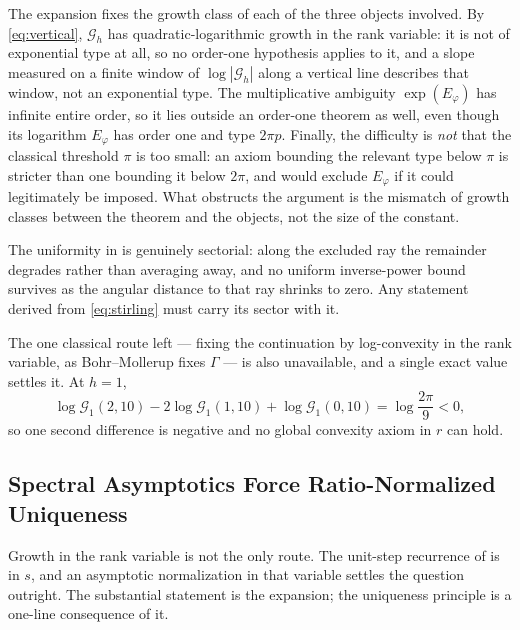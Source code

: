\documentclass[11pt,letterpaper]{article}
\newcommand{\Gc}{\mathcal{G}}               %
\begin{document}
The expansion fixes the growth class of each of the three objects involved.
By \eqref{eq:vertical}, $\Gc_h$ has quadratic-logarithmic growth in the rank
variable: it is not of exponential type at all, so no order-one hypothesis
applies to it, and a slope measured on a finite window of $\log|\Gc_h|$ along a
vertical line describes that window, not an exponential type. The multiplicative
ambiguity $\exp(E_\varphi)$ has infinite entire order, so it lies outside an
order-one theorem as well, even though its logarithm $E_\varphi$ has order one
and type $2\pi p$. Finally, the difficulty is \emph{not} that the classical
threshold $\pi$ is too small: an axiom bounding the relevant type below $\pi$ is
stricter than one bounding it below $2\pi$, and would exclude $E_\varphi$ if it
could legitimately be imposed. What obstructs the argument is the mismatch of
growth classes between the theorem and the objects, not the size of the constant.

The uniformity in  is genuinely sectorial: along the excluded
ray the remainder degrades rather than averaging away, and no uniform
inverse-power bound survives as the angular distance to that ray shrinks to
zero. Any statement derived from \eqref{eq:stirling} must carry its sector with
it.

\begin{remark}
\label{rem:noconvex}
The one classical route left --- fixing the continuation by log-convexity in the
rank variable, as Bohr--Mollerup fixes $\Gamma$ --- is also unavailable, and a
single exact value settles it. At $h=1$,
\begin{equation}
  \log\Gc_1(2,10)-2\log\Gc_1(1,10)+\log\Gc_1(0,10)=\log\frac{2\pi}{9}<0 ,
  \label{eq:noconvex}
\end{equation}
so one second difference is negative and no global convexity axiom in $r$ can
hold.
\end{remark}

\subsection{Spectral Asymptotics Force Ratio-Normalized Uniqueness}

Growth in the rank variable is not the only route. The unit-step recurrence of
 is in $s$, and an asymptotic normalization in that variable
settles the question outright. The substantial statement is the expansion; the
uniqueness principle is a one-line consequence of it.
\end{document}
